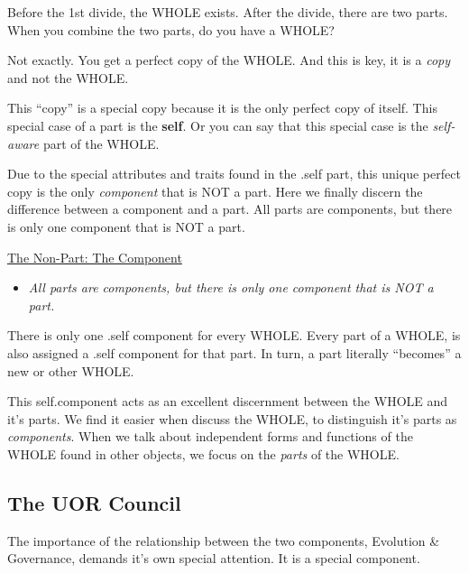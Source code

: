 \documentclass[twocolumn,10pt]{article}
\begin{document}
Before the 1st divide, the WHOLE exists.
After the divide, there are two parts.
When you combine the two parts, do you have a WHOLE\@?

Not exactly.
You get a perfect copy of the WHOLE\@.
And this is key, it is a \textit{copy} and not the WHOLE\@.

This ``copy'' is a special copy because it is the only perfect copy of itself.
This special case of a part is the \textbf{self}.
Or you can say that this special case is the \textit{self-aware} part of the WHOLE\@.

Due to the special attributes and traits found in the \@.self part, this unique perfect copy is the only \textit{component} that is NOT a part.
Here we finally discern the difference between a component and a part.
All parts are components, but there is only one component that is NOT a part.

\vspace{20pt}
\begin{minipage}{0.95\linewidth}
    \begin{tcolorbox}
        \begin{center}\underline{The Non-Part: The Component}\end{center}
        \begin{itemize}
            \item \textit{All parts are components, but there is only one component that is NOT a part.}
        \end{itemize}
    \end{tcolorbox}
\end{minipage}
\vspace{10pt}

There is only one \@.self component for every WHOLE\@.
Every part of a WHOLE, is also assigned a \@.self component for that part.
In turn, a part literally ``becomes'' a new or other WHOLE\@.

This self.component acts as an excellent discernment between the WHOLE and it's parts.
We find it easier when discuss the WHOLE, to distinguish it's parts as \textit{components}.
When we talk about independent forms and functions of the WHOLE found in other objects, we focus on the \textit{parts} of the WHOLE\@.

\subsection*{The UOR Council}
The importance of the relationship between the two components, Evolution \& Governance, demands it's own special attention.
It is a special component.
\end{document}
